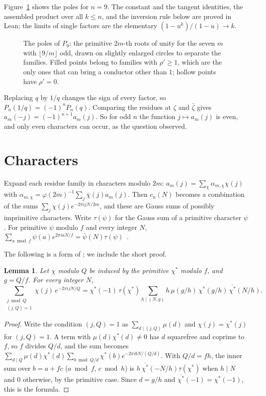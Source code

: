 \documentclass[11pt]{article}
\newtheorem{lemma}[theorem]{Lemma}
\begin{document}
Figure~\ref{fig:poles} shows the poles for $n=9$. The constant and the tangent identities, the assembled product over
all $k\le n$, and the inversion rule below are proved in Lean; the limits of single factors are the elementary
$(1-u^k)/(1-u)\to k$.

\begin{figure}[ht]
\centering

\caption{The poles of $P_9$: the primitive $2m$-th roots of unity for the seven $m$ with $\lfloor 9/m\rfloor$ odd,
drawn on slightly enlarged circles to separate the families. Filled points belong to families with $\rho'\ge1$, which
are the only ones that can bring a conductor other than $1$; hollow points have $\rho'=0$.}
\label{fig:poles}
\end{figure}

Replacing $q$ by $1/q$ changes the sign of every factor, so $P_n(1/q)=(-1)^nP_n(q)$. Comparing the residues at
$\zeta$ and $\bar\zeta$ gives $a_m(-j)=(-1)^{n+1}a_m(j)$. So for odd $n$ the function $j\mapsto a_m(j)$ is even, and
only even characters can occur, as the question observed.

\section{Characters}

Expand each residue family in characters modulo $2m$: $a_m(j)=\sum_\chi\alpha_{m,\chi}\chi(j)$ with
$\alpha_{m,\chi}=\varphi(2m)^{-1}\sum_j\bar\chi(j)a_m(j)$. Then $c_n(N)$ becomes a combination of the sums
$\sum_j\chi(j)e^{-2\pi ijN/2m}$, and these are Gauss sums of possibly imprimitive characters. Write $\tau(\psi)$ for
the Gauss sum of a primitive character $\psi$. For primitive $\psi$ modulo $f$ and every integer $N$,
$\sum_{a\bmod f}\psi(a)e^{2\pi iaN/f}=\bar\psi(N)\tau(\psi)$~\cite[Theorem~9.7]{MV}.

The following is a form of \cite[Theorem~9.12]{MV}; we include the short proof.

\begin{lemma}\label{lem:gauss}
Let $\chi$ modulo $Q$ be induced by the primitive $\chi^*$ modulo $f$, and $g=Q/f$. For every integer $N$,
\[
\sum_{\substack{j\bmod Q\\(j,Q)=1}}\chi(j)\,e^{-2\pi ijN/Q}=\chi^*(-1)\,\tau(\chi^*)\sum_{h\mid(N,g)}h\,\mu(g/h)\,\chi^*(g/h)\,\overline{\chi^*}(N/h).
\]
\end{lemma}

\begin{proof}
Write the condition $(j,Q)=1$ as $\sum_{d\mid(j,Q)}\mu(d)$ and $\chi(j)=\chi^*(j)$ for $(j,Q)=1$. A term with
$\mu(d)\chi^*(d)\ne0$ has $d$ squarefree and coprime to $f$, so $f$ divides $Q/d$, and the sum becomes
$\sum_{d\mid Q}\mu(d)\chi^*(d)\sum_{b\bmod Q/d}\chi^*(b)e^{-2\pi i bN/(Q/d)}$. With $Q/d=fh$, the inner sum over
$b=a+fc$ ($a\bmod f$, $c\bmod h$) is $h\,\overline{\chi^*}(-N/h)\tau(\chi^*)$ when $h\mid N$ and $0$ otherwise, by the primitive case. Since
$d=g/h$ and $\overline{\chi^*}(-1)=\chi^*(-1)$, this is the formula.
\end{proof}
\end{document}
